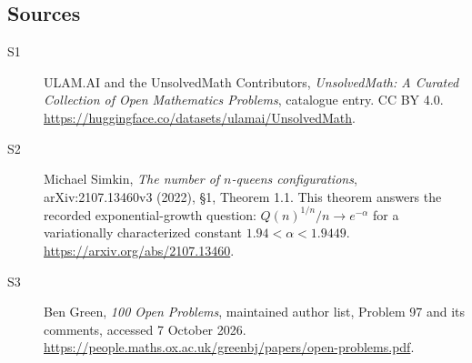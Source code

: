 \documentclass[11pt]{article}
\begin{document}
\subsection{Sources}
\begin{description}
\item[\hypertarget{source:statement:1}{S1}] ULAM.AI and the UnsolvedMath Contributors, \emph{UnsolvedMath: A Curated Collection of Open Mathematics Problems}, catalogue entry. CC BY 4.0. \url{https://huggingface.co/datasets/ulamai/UnsolvedMath}.
\item[\hypertarget{source:statement:2}{S2}] Michael Simkin, \emph{The number of $n$-queens configurations}, arXiv:2107.13460v3 (2022), §1, Theorem 1.1. This theorem answers the recorded exponential-growth question: $Q(n)^{1/n}/n\to e^{-\alpha}$ for a variationally characterized constant $1.94<\alpha<1.9449$. \url{https://arxiv.org/abs/2107.13460}.
\item[\hypertarget{source:statement:3}{S3}] Ben Green, \emph{100 Open Problems}, maintained author list, Problem 97 and its comments, accessed 7 October 2026. \url{https://people.maths.ox.ac.uk/greenbj/papers/open-problems.pdf}.
\end{description}
\label{end:statement}
\end{document}
